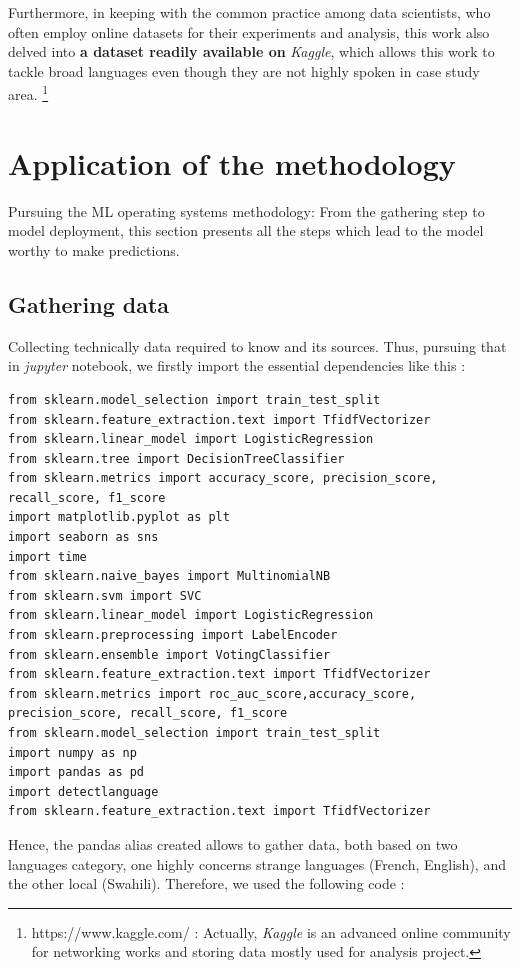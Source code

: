 \documentclass[12pt,a4paper, oneside]{book}
\begin{document}
Furthermore, in keeping with the common practice among data scientists, who often employ online datasets for their experiments and analysis, this work also delved into \textbf{a dataset readily available on} \textit{Kaggle}, which allows this work to tackle broad languages even though they are not highly spoken in case study area. \footnote{https://www.kaggle.com/ : Actually, \textit{Kaggle} is an advanced online community for networking works and storing data mostly used for analysis project.} 

\section{Application of the methodology} 
Pursuing the ML operating systems methodology: From the gathering step to model deployment, this section presents all the steps which lead to the model worthy to make predictions. 
\subsection{Gathering data} 
Collecting technically data required to know and its sources. Thus, pursuing that in \textit{jupyter} notebook, we firstly import the essential dependencies like this :
\begin{lstlisting}[style=stylejupyter]
from sklearn.model_selection import train_test_split
from sklearn.feature_extraction.text import TfidfVectorizer
from sklearn.linear_model import LogisticRegression 
from sklearn.tree import DecisionTreeClassifier
from sklearn.metrics import accuracy_score, precision_score, recall_score, f1_score
import matplotlib.pyplot as plt 
import seaborn as sns
import time
from sklearn.naive_bayes import MultinomialNB
from sklearn.svm import SVC 
from sklearn.linear_model import LogisticRegression 
from sklearn.preprocessing import LabelEncoder
from sklearn.ensemble import VotingClassifier
from sklearn.feature_extraction.text import TfidfVectorizer
from sklearn.metrics import roc_auc_score,accuracy_score, precision_score, recall_score, f1_score
from sklearn.model_selection import train_test_split
import numpy as np 
import pandas as pd 
import detectlanguage  
from sklearn.feature_extraction.text import TfidfVectorizer
\end{lstlisting}
Hence, the pandas alias created allows to gather data, both based on two languages category, one highly concerns strange languages (French, English), and the other local (Swahili). Therefore, we used the following code : \\
\end{document}
